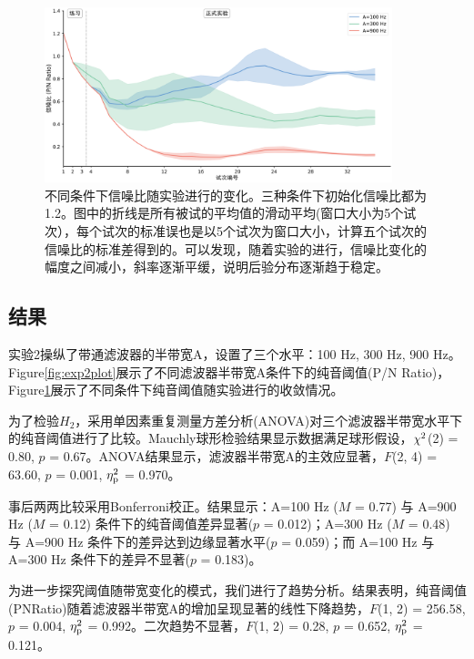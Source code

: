 \documentclass[jou,12pt,floatsintext]{apa7} %
\begin{document}
\begin{figure}[!t]
    \centering
    \includegraphics[width = 0.9\textwidth]{figure/questplot.png}
    \captionsetup{labelsep=period}
    \caption{\small \rm 不同条件下信噪比随实验进行的变化。三种条件下初始化信噪比都为1.2。图中的折线是所有被试的平均值的滑动平均(窗口大小为5个试次），每个试次的标准误也是以5个试次为窗口大小，计算五个试次的信噪比的标准差得到的。可以发现，随着实验的进行，信噪比变化的幅度之间减小，斜率逐渐平缓，说明后验分布逐渐趋于稳定。}
    \label{fig:quest}
\end{figure}

\subsection{\heiti 结果}
\vspace{-1em}

实验2操纵了带通滤波器的半带宽A，设置了三个水平：100 Hz, 300 Hz, 900 Hz。Figure\ref{fig:exp2plot}展示了不同滤波器半带宽A条件下的纯音阈值(P/N Ratio)，Figure\ref{fig:quest}展示了不同条件下纯音阈值随实验进行的收敛情况。

为了检验\(H_2\)，采用单因素重复测量方差分析(ANOVA)对三个滤波器半带宽水平下的纯音阈值进行了比较。Mauchly球形检验结果显示数据满足球形假设，\(\rm \chi^2\)(2) = 0.80, \(p\) = 0.67。ANOVA结果显示，滤波器半带宽A的主效应显著，\(F\)(2, 4) = 63.60, \(p\) = 0.001, \(\rm \eta_p^2\) = 0.970。

事后两两比较采用Bonferroni校正。结果显示：A=100 Hz (\(M\) = 0.77) 与 A=900 Hz (\(M\) = 0.12) 条件下的纯音阈值差异显著(\(p\) = 0.012)；A=300 Hz (\(M\) = 0.48) 与 A=900 Hz 条件下的差异达到边缘显著水平(\(p\) = 0.059)；而 A=100 Hz 与 A=300 Hz 条件下的差异不显著(\(p\) = 0.183)。

为进一步探究阈值随带宽变化的模式，我们进行了趋势分析。结果表明，纯音阈值(PNRatio)随着滤波器半带宽A的增加呈现显著的线性下降趋势，\(F\)(1, 2) = 256.58, \(p\) = 0.004, \(\rm \eta_p^2\) = 0.992。二次趋势不显著，\(F\)(1, 2) = 0.28, \(p\) = 0.652, \(\rm \eta_p^2\)  = 0.121。
\end{document}
